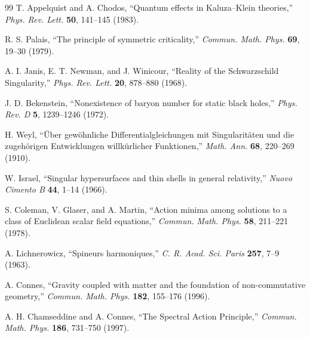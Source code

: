 \documentclass[11pt,a4paper]{article}
\theoremstyle{definition}
\theoremstyle{plain}
\theoremstyle{remark}
\begin{document}
\begin{thebibliography}{99}
 T. Appelquist and A. Chodos, ``Quantum effects in Kaluza--Klein theories,'' \textit{Phys. Rev. Lett.} \textbf{50}, 141--145 (1983).

 R. S. Palais, ``The principle of symmetric criticality,'' \textit{Commun. Math. Phys.} \textbf{69}, 19--30 (1979).

 A. I. Janis, E. T. Newman, and J. Winicour, ``Reality of the Schwarzschild Singularity,'' \textit{Phys. Rev. Lett.} \textbf{20}, 878--880 (1968).

 J. D. Bekenstein, ``Nonexistence of baryon number for static black holes,'' \textit{Phys. Rev. D} \textbf{5}, 1239--1246 (1972).

 H. Weyl, ``\"Uber gew\"ohnliche Differentialgleichungen mit Singularit\"aten und die zugeh\"origen Entwicklungen willk\"urlicher Funktionen,'' \textit{Math. Ann.} \textbf{68}, 220--269 (1910).

 W. Israel, ``Singular hypersurfaces and thin shells in general relativity,'' \textit{Nuovo Cimento B} \textbf{44}, 1--14 (1966).

 S. Coleman, V. Glaser, and A. Martin, ``Action minima among solutions to a class of Euclidean scalar field equations,'' \textit{Commun. Math. Phys.} \textbf{58}, 211--221 (1978).

 A. Lichnerowicz, ``Spineurs harmoniques,'' \textit{C. R. Acad. Sci. Paris} \textbf{257}, 7--9 (1963).

 A. Connes, ``Gravity coupled with matter and the foundation of non-commutative geometry,'' \textit{Commun. Math. Phys.} \textbf{182}, 155--176 (1996).

 A. H. Chamseddine and A. Connes, ``The Spectral Action Principle,'' \textit{Commun. Math. Phys.} \textbf{186}, 731--750 (1997).

\end{thebibliography}
\end{document}
